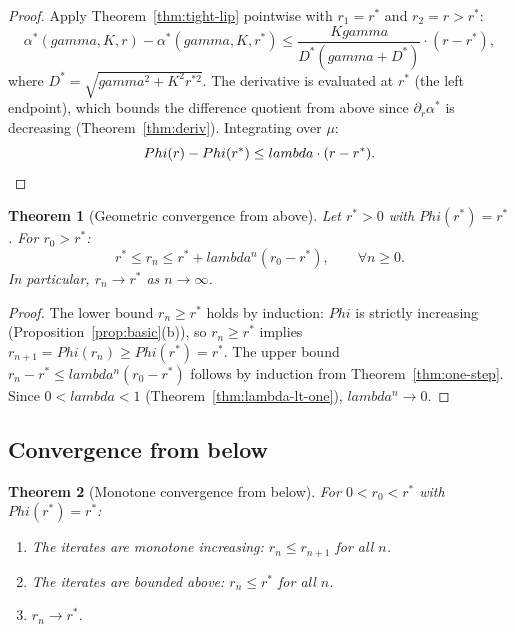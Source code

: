 \documentclass[11pt,a4paper]{article}
\let\Phi\relax\def\Phi{Phi}%
\let\lambda\relax\def\lambda{lambda}%
\let\gamma\relax\def\gamma{gamma}%
\newtheorem{theorem}{Theorem}[section]
\theoremstyle{definition}
\begin{document}
\begin{proof}
Apply Theorem~\ref{thm:tight-lip} pointwise with $r_1 = r^*$ and $r_2 = r > r^*$:
\[
\alpha^*(\gamma, K, r) - \alpha^*(\gamma, K, r^*) \leq \frac{K\gamma}{D^*(\gamma + D^*)} \cdot (r - r^*),
\]
where $D^* = \sqrt{\gamma^2 + K^2 r^{*2}}$. The derivative is evaluated at $r^*$ (the left endpoint), which bounds the difference quotient from above since $\partial_r\alpha^*$ is decreasing (Theorem~\ref{thm:deriv}). Integrating over $\mu$:
\[
\Phi(r) - \Phi(r^*) \leq \lambda \cdot (r - r^*). \qedhere
\]
\end{proof}

\begin{theorem}[Geometric convergence from above]\label{thm:geometric}
Let $r^* > 0$ with $\Phi(r^*) = r^*$. For $r_0 > r^*$:
\begin{equation}\label{eq:geometric}
r^* \leq r_n \leq r^* + \lambda^n (r_0 - r^*), \qquad \forall n \geq 0.
\end{equation}
In particular, $r_n \to r^*$ as $n \to \infty$.
\end{theorem}

\begin{proof}
The lower bound $r_n \geq r^*$ holds by induction: $\Phi$ is strictly increasing (Proposition~\ref{prop:basic}(b)), so $r_n \geq r^*$ implies $r_{n+1} = \Phi(r_n) \geq \Phi(r^*) = r^*$. The upper bound $r_n - r^* \leq \lambda^n(r_0 - r^*)$ follows by induction from Theorem~\ref{thm:one-step}. Since $0 < \lambda < 1$ (Theorem~\ref{thm:lambda-lt-one}), $\lambda^n \to 0$.
\end{proof}

\subsection{Convergence from below}

\begin{theorem}[Monotone convergence from below]\label{thm:below}
For $0 < r_0 < r^*$ with $\Phi(r^*) = r^*$:
\begin{enumerate}[label=(\alph*),nosep]
\item The iterates are monotone increasing: $r_n \leq r_{n+1}$ for all $n$.
\item The iterates are bounded above: $r_n \leq r^*$ for all $n$.
\item $r_n \to r^*$.
\end{enumerate}
\end{theorem}
\end{document}
